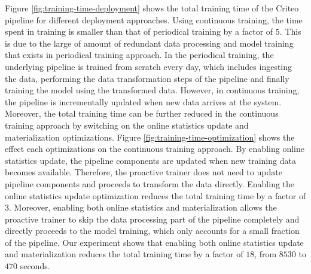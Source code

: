 Figure \ref{fig:training-time-deployment} shows the total training time of the Criteo pipeline for different deployment approaches.
Using continuous training, the time spent in training is smaller than that of periodical training by a factor of $5$.
This is due to the large of amount of redundant data processing and model training that exists in periodical training approach.
In the periodical training, the underlying pipeline is trained from scratch every day, which includes ingesting the data, performing the data transformation steps of the pipeline and finally training the model using the transformed data.
However, in continuous training, the pipeline is incrementally updated when new data arrives at the system.
Moreover, the total training time can be further reduced in the continuous training approach by switching on the online statistics update and materialization optimizations.
Figure \ref{fig:training-time-optimization} shows the effect each optimizations on the continuous training approach.
By enabling online statistics update, the pipeline components are updated when new training data becomes available.
Therefore, the proactive trainer does not need to update pipeline components and proceeds to transform the data directly.
Enabling the online statistics update optimization reduces the total training time by a factor of 3.
Moreover, enabling both online statistics and materialization allows the proactive trainer to skip the data processing part of the pipeline completely and directly proceeds to the model training, which only accounts for a small fraction of the pipeline.
Our experiment shows that enabling both online statistics update and materialization reduces the total training time by a factor of $18$, from $8530$ to $470$ seconds.

